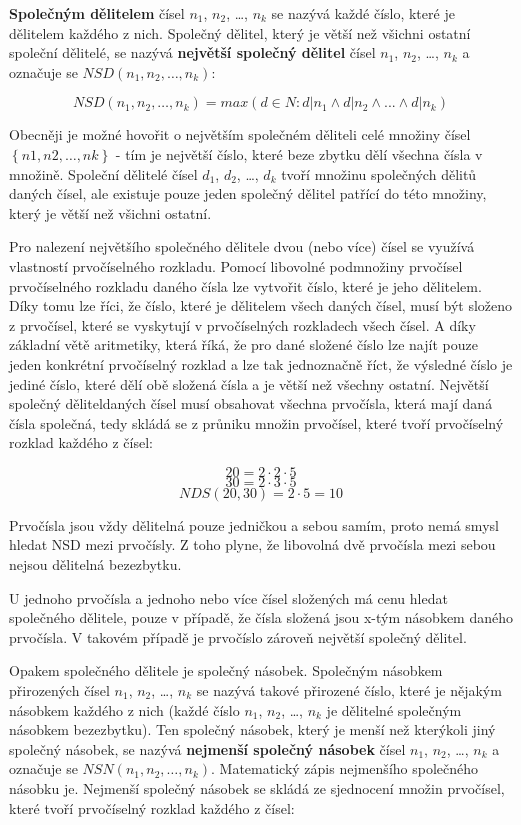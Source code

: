 
{\bf Společným dělitelem} čísel $n_1$, $n_2$, …, $n_k$ se nazývá každé číslo, které je dělitelem každého z nich. Společný dělitel, který je větší než všichni ostatní společní dělitelé, se nazývá {\bf největší společný dělitel} čísel $n_1$, $n_2$, …, $n_k$ a označuje se $NSD(n_1, n_2, …, n_k)$:

$$NSD(n_1, n_2, …, n_k) = max(d \in N : d | n_1 \wedge d | n_2 \wedge ... \wedge d | n_k )$$

Obecněji je možné hovořit o největším společném děliteli celé množiny čísel $\left\{n1, n2, …, nk\right\}$ - tím je největší číslo, které beze zbytku dělí všechna čísla v množině.  Společní dělitelé čísel $d_1$, $d_2$, …, $d_k$ tvoří množinu společných dělitů daných čísel, ale existuje pouze jeden společný dělitel patřící do této množiny, který je větší než všichni ostatní.

Pro nalezení největšího společného dělitele dvou (nebo více) čísel se využívá vlastností prvočíselného rozkladu. Pomocí libovolné podmnožiny prvočísel prvočíselného rozkladu daného čísla lze vytvořit číslo, které je jeho dělitelem. Díky tomu lze říci, že číslo, které je dělitelem všech daných čísel, musí být složeno z prvočísel, které se vyskytují v prvočíselných rozkladech všech čísel. A díky základní větě aritmetiky, která říká, že pro dané složené číslo lze najít pouze jeden konkrétní prvočíselný rozklad a lze tak jednoznačně říct, že výsledné číslo je jediné číslo, které dělí obě složená čísla a je větší než všechny ostatní. Největší společný děliteldaných čísel musí obsahovat všechna prvočísla, která mají daná čísla společná, tedy skládá se z průniku množin prvočísel, které tvoří prvočíselný rozklad každého z čísel:

$$ 20 = 2 \cdot 2 \cdot 5 $$
$$ 30 = 2 \cdot 3 \cdot 5 $$
$$ NDS(20,30) = 2 \cdot 5 = 10 $$

Prvočísla jsou vždy dělitelná pouze jedničkou a sebou samím, proto nemá smysl hledat NSD mezi prvočísly. Z toho plyne, že libovolná dvě prvočísla mezi sebou nejsou dělitelná bezezbytku.

U jednoho prvočísla a jednoho nebo více čísel složených má cenu hledat společného dělitele, pouze v případě, že čísla složená jsou x-tým násobkem daného prvočísla. V takovém případě je prvočíslo zároveň největší společný dělitel.


Opakem společného dělitele je společný násobek. Společným násobkem  přirozených čísel $n_1$, $n_2$, …, $n_k$ se nazývá takové přirozené číslo, které je nějakým násobkem každého z nich (každé číslo $n_1$, $n_2$, …, $n_k$ je dělitelné  společným násobkem bezezbytku). Ten společný násobek, který je menší než kterýkoli jiný společný násobek, se nazývá {\bf nejmenší společný násobek} čísel  $n_1$, $n_2$, …, $n_k$ a označuje se $NSN(n_1, n_2, …, n_k)$. Matematický zápis nejmenšího společného násobku je. Nejmenší společný násobek se skládá ze sjednocení množin prvočísel, které tvoří prvočíselný rozklad každého z čísel:

